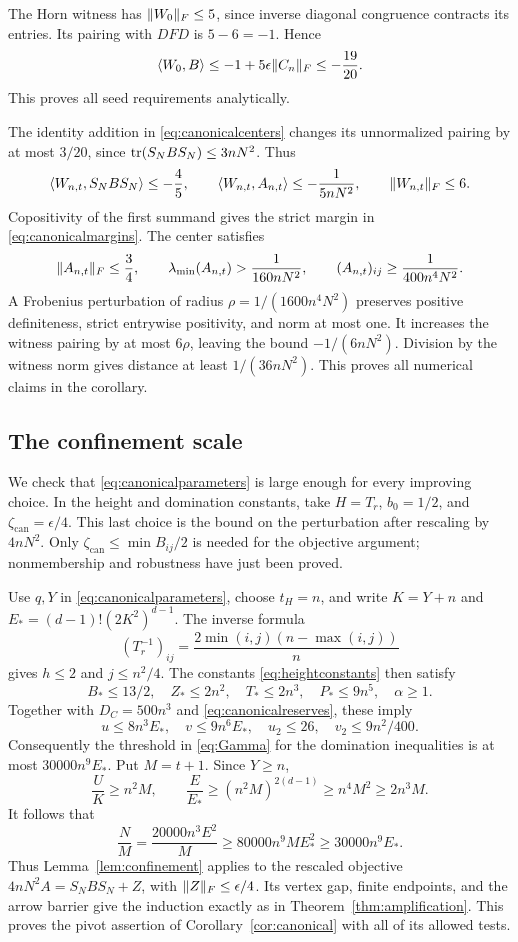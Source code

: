The Horn witness has $\lVert W_0\rVert_F\le5$, since inverse diagonal congruence contracts its entries. Its pairing with $DFD$ is $5-6=-1$. Hence
\[
 \langle W_0,B\rangle\le-1+5\epsilon\lVert C_n\rVert_F\le-\frac{19}{20}.
\]
This proves all seed requirements analytically.

The identity addition in \eqref{eq:canonicalcenters} changes its unnormalized pairing by at most $3/20$, since $\operatorname{tr}(S_NBS_N)\le3nN^2$. Thus
\begin{equation}\label{eq:canonicalpairing}
 \langle W_{n,t},S_NBS_N\rangle\le-\frac45,\qquad
 \langle W_{n,t},A_{n,t}\rangle\le-\frac1{5nN^2},
 \qquad \lVert W_{n,t}\rVert_F\le6.
\end{equation}
Copositivity of the first summand gives the strict margin in \eqref{eq:canonicalmargins}. The center satisfies
\[
 \lVert A_{n,t}\rVert_F\le\frac34,\qquad
 \lambda_{\min}(A_{n,t})>\frac1{160nN^2},\qquad
 (A_{n,t})_{ij}\ge\frac1{400n^4N^2}.
\]
A Frobenius perturbation of radius $\rho=1/(1600n^4N^2)$ preserves positive definiteness, strict entrywise positivity, and norm at most one. It increases the witness pairing by at most $6\rho$, leaving the bound $-1/(6nN^2)$. Division by the witness norm gives distance at least $1/(36nN^2)$. This proves all numerical claims in the corollary.

\subsection{The confinement scale}
We check that \eqref{eq:canonicalparameters} is large enough for every improving choice. In the height and domination constants, take $H=T_r$, $b_0=1/2$, and $\zeta_{\mathrm{can}}=\epsilon/4$. This last choice is the bound on the perturbation after rescaling by $4nN^2$. Only $\zeta_{\mathrm{can}}\le\min B_{ij}/2$ is needed for the objective argument; nonmembership and robustness have just been proved.

Use $q,Y$ in \eqref{eq:canonicalparameters}, choose $t_H=n$, and write
$K=Y+n$ and $E_*=(d-1)!(2K^2)^{d-1}$. The inverse formula
\[
 (T_r^{-1})_{ij}=\frac{2\min(i,j)(n-\max(i,j))}{n}
\]
gives $h\le2$ and $j\le n^2/4$. The constants \eqref{eq:heightconstants} then satisfy
\[
 B_*\le13/2,\quad Z_*\le2n^2,\quad T_*\le2n^3,\quad
 P_*\le9n^5,\quad\alpha\ge1.
\]
Together with $D_C=500n^3$ and \eqref{eq:canonicalreserves}, these imply
\[
 u\le8n^3E_*,\quad v\le9n^6E_*,\quad
 u_2\le26,\quad v_2\le9n^2/400.
\]
Consequently the threshold in \eqref{eq:Gamma} for the domination inequalities is at most $30000n^9E_*$. Put $M=t+1$. Since $Y\ge n$,
\[
 \frac UK\ge n^2M,\qquad
 \frac E{E_*}\ge(n^2M)^{2(d-1)}
                   \ge n^4M^2\ge2n^3M.
\]
It follows that
\[
 \frac NM=\frac{20000n^3E^2}{M}
       \ge80000n^9ME_*^2\ge30000n^9E_*.
\]
Thus Lemma~\ref{lem:confinement} applies to the rescaled objective
$4nN^2A=S_NBS_N+Z$, with $\lVert Z\rVert_F\le\epsilon/4$.
Its vertex gap, finite endpoints, and the arrow barrier give the induction exactly as in Theorem~\ref{thm:amplification}. This proves the pivot assertion of Corollary~\ref{cor:canonical} with all of its allowed tests.

